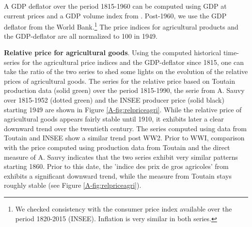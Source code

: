\documentclass[11pt]{report}
\begin{document}
A GDP deflator over the period 1815-1960 can be computed using GDP at current prices and a GDP volume index from \cite{toutain1987produit}. Post-1960, we use the GDP deflator from the World Bank.\footnote{We checked consistency with the consumer price index available over the period 1820-2015 (INSEE). Inflation is very similar in both series.} The price indices for agricultural products and the GDP-deflator are all normalized to 100 in 1949.


\smallskip

\noindent \textbf{Relative price for agricultural goods}. Using the computed historical time-series for the agricultural price indices and the GDP-deflator since 1815, one can take the ratio of the two series to shed some lights on the evolution of the relative prices of agricultural goods. The series for the relative price based on Toutain production data (solid green) over the period 1815-1990, the serie from A. Sauvy over 1815-1952 (dotted green) and the INSEE producer price (solid black) starting 1949 are shown in Figure \ref{A-fig:relpriceagri}. While the relative price of agricultural goods appears fairly stable until 1910, it exhibits later a clear downward trend over the twentieth century. The series computed using data from Toutain and INSEE show a similar trend post WW2. Prior to WWI, comparison with the price computed using production data from Toutain and the direct measure of A. Sauvy indicates that the two series exhibit very similar patterns starting 1860. Prior to this date, the 'indice des prix de gros agricoles' from \cite{sauvy1952variations} exhibits a significant downward trend, while the measure from Toutain stays roughly stable (see Figure \ref{A-fig:relpriceagri}). 
\end{document}
